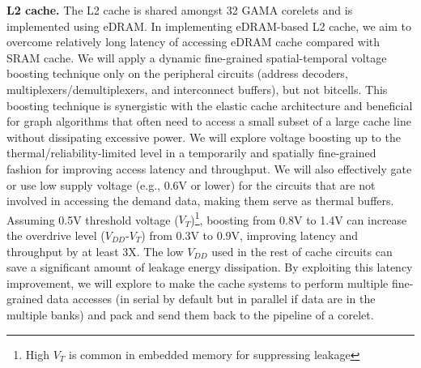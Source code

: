 \vspace{3pt}
\noindent
\textbf{L2 cache.}
The L2 cache is shared amongst 32 GAMA corelets and is implemented using eDRAM. In implementing eDRAM-based L2 cache, we aim to %
overcome relatively long latency of accessing eDRAM cache compared with SRAM cache. 
We will apply a dynamic fine-grained spatial-temporal voltage boosting technique only on the peripheral circuits (address decoders, multiplexers/demultiplexers, and interconnect buffers), but not bitcells. 
This boosting technique is synergistic with the elastic cache architecture and beneficial for graph algorithms that often need to access a small subset of a large cache line without dissipating excessive power. 
We will explore voltage boosting up to the thermal/reliability-limited level in a temporarily and spatially fine-grained fashion for improving access latency and throughput. 
We will also effectively gate or use low supply voltage (e.g., 0.6V or lower) for the circuits that are not involved in accessing the demand data, making them serve as thermal buffers. 
Assuming 0.5V threshold voltage ($V_T$)\footnote{High $V_T$ is common in embedded memory for suppressing leakage}, boosting from 0.8V to 1.4V can increase the overdrive level ($V_{DD}$-$V_T$) from 0.3V to 0.9V, improving latency and throughput by at least 3X. 
The low $V_{DD}$ used in the rest of cache circuits can save a significant amount of leakage energy dissipation. 
By exploiting this latency improvement, we will explore to make the cache systems to perform multiple fine-grained data accesses (in serial by default but in parallel if data are in the multiple banks) and pack and send them back to the pipeline of a corelet. 

